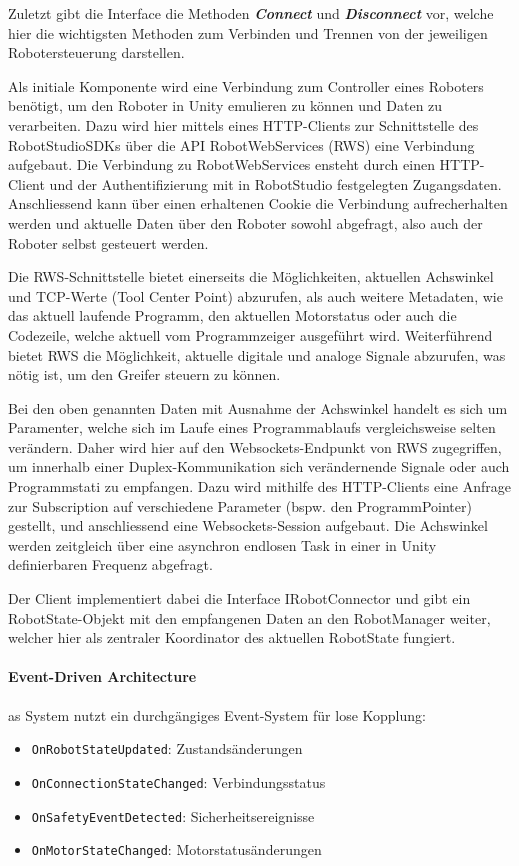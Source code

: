 Zuletzt gibt die Interface die Methoden \textit{\textbf{Connect}} und \textit{\textbf{Disconnect}}
vor, welche hier die wichtigsten Methoden zum Verbinden und
Trennen von der jeweiligen Robotersteuerung darstellen.

Als initiale Komponente wird eine Verbindung zum
Controller eines Roboters benötigt, um den Roboter in Unity emulieren zu können
und Daten zu verarbeiten. Dazu wird hier mittels eines HTTP-Clients zur
Schnittstelle des RobotStudioSDKs über die API RobotWebServices (RWS) eine
Verbindung aufgebaut. Die Verbindung zu RobotWebServices ensteht durch einen
HTTP-Client und der Authentifizierung mit in RobotStudio festgelegten
Zugangsdaten. Anschliessend kann über einen erhaltenen Cookie die Verbindung
aufrecherhalten werden und aktuelle Daten über den Roboter sowohl abgefragt,
also auch der Roboter selbst gesteuert werden.

Die RWS-Schnittstelle bietet einerseits die Möglichkeiten,
aktuellen Achswinkel und TCP-Werte (Tool Center Point) abzurufen, als auch
weitere Metadaten, wie das aktuell laufende Programm, den aktuellen Motorstatus
oder auch die Codezeile, welche aktuell vom Programmzeiger ausgeführt wird.
Weiterführend bietet RWS die Möglichkeit, aktuelle digitale und analoge
Signale abzurufen, was nötig ist, um den Greifer steuern zu können.

Bei den oben genannten Daten mit Ausnahme der Achswinkel handelt es sich um
Paramenter, welche sich im Laufe eines Programmablaufs vergleichsweise selten
verändern. Daher wird hier auf den Websockets-Endpunkt von RWS zugegriffen, um
innerhalb einer Duplex-Kommunikation sich verändernende Signale oder auch
Programmstati zu empfangen. Dazu wird mithilfe des HTTP-Clients eine Anfrage zur
Subscription auf verschiedene Parameter (bspw. den ProgrammPointer) gestellt,
und anschliessend eine Websockets-Session aufgebaut. Die Achswinkel werden
zeitgleich über eine asynchron endlosen Task in einer in Unity definierbaren
Frequenz abgefragt.

Der Client implementiert dabei die Interface IRobotConnector und gibt ein
RobotState-Objekt mit den empfangenen Daten an den RobotManager weiter, welcher hier
als zentraler Koordinator des aktuellen RobotState fungiert.


\paragraph{Event-Driven Architecture}
as System nutzt ein durchgängiges Event-System für lose Kopplung:
\begin{itemize}
	\item \texttt{OnRobotStateUpdated}: Zustandsänderungen
	\item \texttt{OnConnectionStateChanged}: Verbindungsstatus
	\item \texttt{OnSafetyEventDetected}: Sicherheitsereignisse
	\item \texttt{OnMotorStateChanged}: Motorstatusänderungen
\end{itemize}

